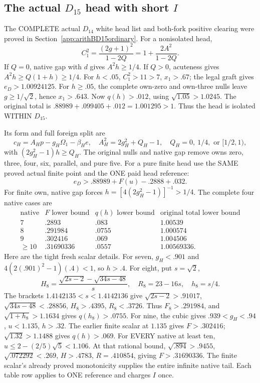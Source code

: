 \documentclass[11pt]{article}
\begin{document}
\subsection[The actual D15 head with short I]{The actual \(D_{15}\) head with short \(I\)}
\label{app:arithD15Ihead}

The COMPLETE actual \(D_{14}\) white head list and
both-fork positive clearing were proved in
Section~\ref{app:arithBD15ordinary}.
For a nonisolated head,
\[
 C_1^2={\frac{(2g+1)^2}{1-2Q}}
       =1+{\frac{2A^2}{1-2Q}}.
\]
If \(Q=0\), native gap with \(d\) gives \(A^2h\ge1/4\).
If \(Q>0\), acuteness gives
\(A^2h\ge Q(1+h)\ge1/4\).
For \(h<.05\), \(C_1^2>11>7\), \(x_1>.67\);
the legal graft gives \(e_D>1.00924125\).
For \(h\ge.05\), the complete own-zero and own-three
nulls leave \(g\ge1/\sqrt2\), hence \(x_1>.643\).
Now \(q(h)>.012\), using \(\sqrt{1.05}>1.0245\).
The original total is
\(.88989+.099405+.012=1.001295>1\).
Thus the head is isolated WITHIN \(D_{15}\).

Its form and full foreign split are
\[
 c_H=A_Hp-g_H\Omega_1-\beta_He,\quad
 A_H^2=2g_H^2+Q_H-1,\quad
 Q_H=0,\ 1/4,\text{ or }[1/2,1),
\]
with \((2g_H^2-1)h\ge Q_H\).
The original nulls and native gap remove owns zero,
three, four, six, parallel, and pure five.
For a pure finite head use the SAME proved actual
finite point and the ONE paid head reference:
\[
              e_D>.88989+F(u)-.2888+.032 .
\]
For finite own, native gap forces
\(h=[4(2g_H^2-1)]^{-1}>1/4\).
The complete four native cases are
\[
\begin{array}{c|c|c|c}
 \text{native}&F\text{ lower bound}&q(h)\text{ lower bound}
                         &\text{original total lower bound}\\ \hline
7&.2893&.083&1.00539\\
8&.291984&.0755&1.000574\\
9&.302416&.069&1.004506\\
\ge10&.31690336&.0557&1.00569336 .
\end{array}
\]
Here are the tight fresh scalar details.
For seven, \(g_H<.901\) and
\(4(2(.901)^2-1)(.4)<1\), so \(h>.4\).
For eight, put \(s=\sqrt2\),
\[
 H_8={\frac{\sqrt{2s-2}-\sqrt{34s-48}}{s}},\quad
 R_8=23-16s,\quad h_8=s/4.
\]
The brackets \(1.4142135<s<1.4142136\) give
\(\sqrt{2s-2}>.91017\),
\(\sqrt{34s-48}<.28856\), \(H_8>.4395\),
\(R_8<.3726\).
Thus \(F_8>.291984\), and
\(\sqrt{1+h_8}>1.1634\) gives \(q(h_8)>.0755\).
For nine, the cubic gives \(.939<g_H<.94\),
\(u<1.135\), \(h>.32\).
The earlier finite scalar at \(1.135\) gives
\(F>.302416\); \(\sqrt{1.32}>1.1488\) gives
\(q(h)>.069\).
For EVERY native at least ten,
\(u\le2-(2/5)\sqrt5<1.106\).
At that rational bound,
\(\sqrt{.894}>.9455\), \(\sqrt{.072292}<.269\),
\(H>.4783\), \(R=.410854\),
giving \(F>.31690336\).
The finite scalar's already proved monotonicity supplies
the entire infinite native tail.
Each table row applies to ONE reference and charges \(I\)
once.
\end{document}
